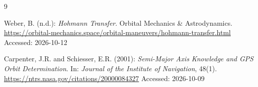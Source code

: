 \documentclass[11pt,a4paper]{article}
\begin{document}
\begin{thebibliography}{9}
		
		Weber, B. (n.d.): \emph{Hohmann Transfer}.
		Orbital Mechanics \& Astrodynamics.
		\newline
		\url{https://orbital-mechanics.space/orbital-maneuvers/hohmann-transfer.html}
		\newline
		Accessed: 2026-10-12
		
		Carpenter, J.R. and Schiesser, E.R. (2001):
		\emph{Semi-Major Axis Knowledge and GPS Orbit Determination}.
		In: \emph{Journal of the Institute of Navigation}, 48(1).
		\newline
		\url{https://ntrs.nasa.gov/citations/20000084327}
		\newline
		Accessed: 2026-10-09
	\end{thebibliography}
\end{document}
